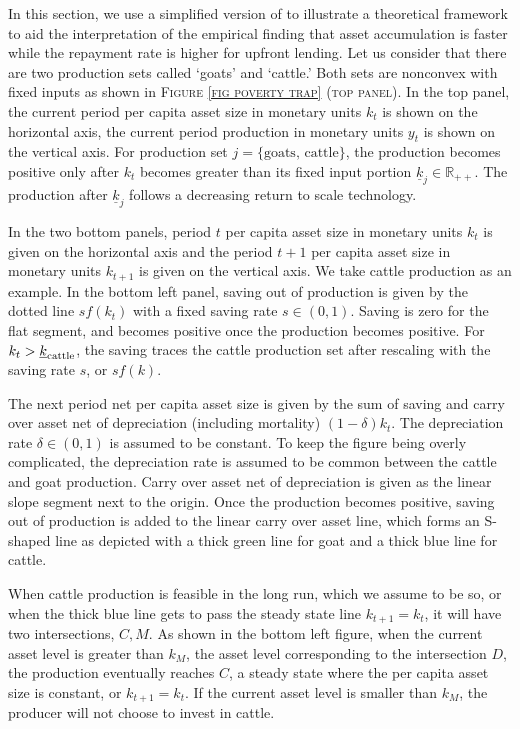 \vspace{2ex}
	In this section, we use a simplified version of \citet{GalorZeira1993} to illustrate a theoretical framework to aid the interpretation of the empirical finding that asset accumulation is faster while the repayment rate is higher for upfront lending. Let us consider that there are two production sets called `goats' and `cattle.' Both sets are nonconvex with fixed inputs as shown in \textsc{\small Figure \ref{fig poverty trap} (top panel)}. 
	In the top panel, the current period per capita asset size in monetary units $k_{t}$ is shown on the horizontal axis, the current period production in monetary units $y_{t}$ is shown on the vertical axis. For production set $j=\{\mbox{goats, cattle}\}$, the production becomes positive only after $k_{t}$ becomes greater than its fixed input portion $\underline{k}_{j}\in\mathbb R_{++}$.  The production after $\underline{k}_{j}$ follows a decreasing return to scale technology. 
	
	In the two bottom panels, period $t$ per capita asset size in monetary units $k_{t}$ is given on the horizontal axis and the period $t+1$ per capita asset size in monetary units $k_{t+1}$ is given on the vertical axis. We take cattle production as an example. In the bottom left panel, saving out of production is given by the dotted line $sf(k_{t})$ with a fixed saving rate $s\in(0, 1)$. Saving is zero for the flat segment, and becomes positive once the production becomes positive. For $k_{t}>\underline{k}_{\mbox{\scriptsize cattle}}$, the saving traces the cattle production set after rescaling with the saving rate $s$, or $sf(k)$. 
	
	The next period net per capita asset size is given by the sum of saving and carry over asset net of depreciation (including mortality) $(1-\delta)k_{t}$.  The depreciation rate $\delta\in(0, 1)$ is assumed to be constant. To keep the figure being overly complicated, the depreciation rate is assumed to be common between the cattle and goat production. Carry over asset net of depreciation is given as the linear slope segment next to the origin. Once the production becomes positive, saving out of production is added to the linear carry over asset line, which forms an S-shaped line as depicted with a thick green line for goat and a thick blue line for cattle. 
	
	When cattle production is feasible in the long run, which we assume to be so, or when the thick blue line gets to pass the steady state line $k_{t+1}=k_{t}$, it will have two intersections, $C, M$. As shown in the bottom left figure, when the current asset level is greater than $k_{M}$, the asset level corresponding to the intersection $D$, the production eventually reaches $C$, a steady state where the per capita asset size is constant, or $k_{t+1}=k_{t}$. If the current asset level is smaller than $k_{M}$, the producer  will not choose to invest in cattle.

